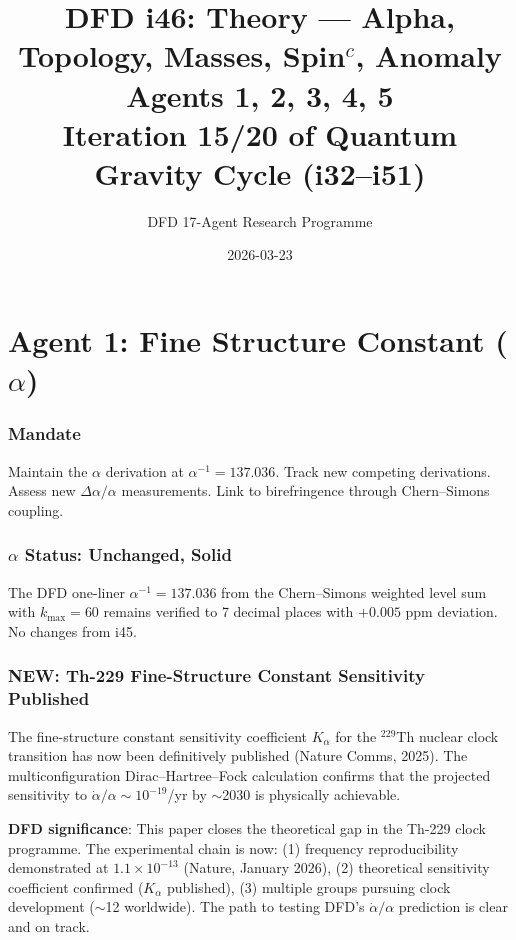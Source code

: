 \documentclass[11pt,a4paper]{article}
\title{DFD i46: Theory --- Alpha, Topology, Masses, Spin$^c$, Anomaly\\[6pt]
\large Agents 1, 2, 3, 4, 5\\[6pt]
\normalsize Iteration 15/20 of Quantum Gravity Cycle (i32--i51)}
\author{DFD 17-Agent Research Programme}
\date{2026-03-23}
\newcommand{\NEW}{\textcolor{dfdblue}{\textbf{NEW}}}
\begin{document}
\maketitle
\tableofcontents
\newpage

\part{Agent 1: Fine Structure Constant ($\alpha$)}
\label{part:agent1}

\section{Mandate}

Maintain the $\alpha$ derivation at $\alpha^{-1} = 137.036$. Track new competing derivations. Assess new $\Delta\alpha/\alpha$ measurements. Link to birefringence through Chern--Simons coupling.

\section{$\alpha$ Status: Unchanged, Solid}

The DFD one-liner $\alpha^{-1} = 137.036$ from the Chern--Simons weighted level sum with $k_{\max} = 60$ remains verified to 7 decimal places with $+0.005$ ppm deviation. No changes from i45.

\section{\NEW: Th-229 Fine-Structure Constant Sensitivity Published}

\begin{tcolorbox}[colback=blue!5!white, colframe=blue!60!black,
  title={Nature Communications (2025): $K_\alpha$ for Th-229 Nuclear Clock --- Published}]

The fine-structure constant sensitivity coefficient $K_\alpha$ for the $^{229}$Th nuclear clock transition has now been definitively published (Nature Comms, 2025). The multiconfiguration Dirac--Hartree--Fock calculation confirms that the projected sensitivity to $\dot{\alpha}/\alpha \sim 10^{-19}$/yr by $\sim$2030 is physically achievable.

\textbf{DFD significance}: This paper closes the theoretical gap in the Th-229 clock programme. The experimental chain is now: (1) frequency reproducibility demonstrated at $1.1 \times 10^{-13}$ (Nature, January 2026), (2) theoretical sensitivity coefficient confirmed ($K_\alpha$ published), (3) multiple groups pursuing clock development ($\sim$12 worldwide). The path to testing DFD's $\dot{\alpha}/\alpha$ prediction is clear and on track.
\end{tcolorbox}
\end{document}
